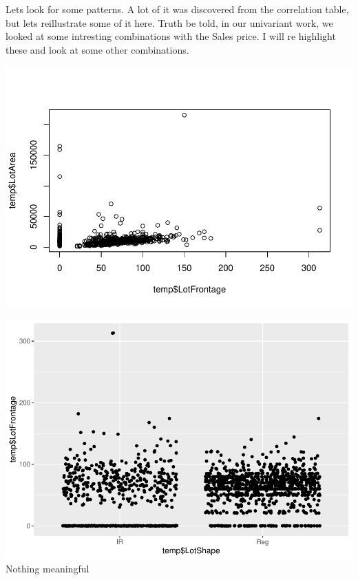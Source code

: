 \documentclass[]{article}
\newenvironment{Shaded}{\begin{snugshade}}{\end{snugshade}}
\newcommand{\KeywordTok}[1]{\textcolor[rgb]{0.13,0.29,0.53}{\textbf{#1}}}
\newcommand{\DataTypeTok}[1]{\textcolor[rgb]{0.13,0.29,0.53}{#1}}
\newcommand{\StringTok}[1]{\textcolor[rgb]{0.31,0.60,0.02}{#1}}
\newcommand{\CommentTok}[1]{\textcolor[rgb]{0.56,0.35,0.01}{\textit{#1}}}
\newcommand{\OperatorTok}[1]{\textcolor[rgb]{0.81,0.36,0.00}{\textbf{#1}}}
\newcommand{\NormalTok}[1]{#1}
\begin{document}
Lets look for some patterns. A lot of it was discovered from the
correlation table, but lets reillustrate some of it here. Truth be told,
in our univariant work, we looked at some intresting combinations with
the Sales price. I will re highlight these and look at some other
combinations.

\begin{Shaded}
\end{Shaded}

\includegraphics{EDA_files/figure-latex/unnamed-chunk-110-1.pdf}

\begin{Shaded}
\end{Shaded}

\includegraphics{EDA_files/figure-latex/unnamed-chunk-110-2.pdf} Nothing
meaningful
\end{document}
